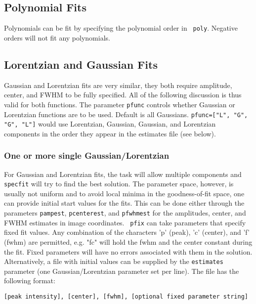 \subsection{Polynomial Fits}
\label{section:analysis.specfit.poly}

Polynomials can be fit by specifying the polynomial order in {\tt
  poly}. Negative orders will not fit any polynomials. 

\subsection{Lorentzian and Gaussian Fits}
\label{section:analysis.specfit.lorgau}

Gaussian and Lorentzian fits are very similar, they both require
amplitude, center, and FWHM to be fully specified. All of the
following discussion is thus valid for both functions. The parameter
{\tt pfunc} controls whether Gaussian or Lorentzian functions are to
be used. Default is all Gaussians. {\tt pfunc=["L", "G", "G", "L"]}
would use Lorentzian, Gaussian, Gaussian, and Lorentzian
components in the order they appear in the estimates file (see below).

\subsubsection{One or more single Gaussian/Lorentzian}
\label{section:analysis.specfit.lorgau.single}

For Gaussian and Lorentzian fits, the task will allow multiple
components and {\tt specfit} will try to find the best solution. The
parameter space, however, is usually not uniform and to avoid local
minima in the goodness-of-fit space, one can provide initial start
values for the fits. This can be done either through the parameters
{\tt pampest}, {\tt pcenterest}, and {\tt pfwhmest} for the
amplitudes, center, and FWHM estimates in image coordinates. {\tt
  pfix} can take parameters that specify fixed fit values.  Any
combination of the characters 'p' (peak), 'c' (center), and 'f' (fwhm)
are permitted, e.g. "fc" will hold the fwhm and the center constant
during the fit. Fixed parameters will have no errors associated with
them in the solution.  Alternatively, a file with initial values can
be supplied by the {\tt estimates} parameter (one Gaussian/Lorentzian parameter
set per line). The file has the following format:

{\tt [peak intensity], [center], [fwhm], [optional fixed parameter string]}

